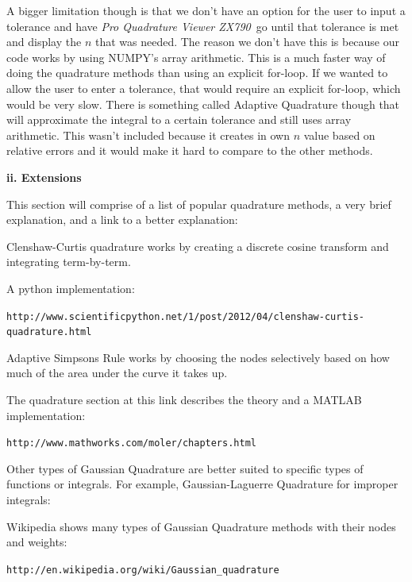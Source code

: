 \documentclass[12pt]{article}
\newcommand{\newLine}{\vspace{5mm}}
\newcommand{\appname}{\textit{Pro Quadrature Viewer ZX790}}
\newcommand{\nextsubsection}[1]{\newLine \noindent \large \textbf{#1} \normalsize}
\begin{document}
\newLine A bigger limitation though is that we don't have an option for the user to input a tolerance and have \appname\, go until that tolerance is met and display the $n$ that was needed. The reason we don't have this is because our code works by using NUMPY's array arithmetic. This is a much faster way of doing the quadrature methods than using an explicit for-loop. If we wanted to allow the user to enter a tolerance, that would require an explicit for-loop, which would be very slow. There is something called Adaptive Quadrature though that will approximate the integral to a certain tolerance and still uses array arithmetic. This wasn't included because it creates in own $n$ value based on relative errors and it would make it hard to compare to the other methods.

\nextsubsection{ii. Extensions}

\newLine This section will comprise of a list of popular quadrature methods, a very brief explanation, and a link to a better explanation:

\newLine Clenshaw-Curtis quadrature works by creating a discrete cosine transform and integrating term-by-term. 

\newLine\noindent A python implementation: 

\texttt{\small http://www.scientificpython.net/1/post/2012/04/clenshaw-curtis-quadrature.html \normalsize}

\newLine \newLine Adaptive Simpsons Rule works by choosing the nodes selectively based on how much of the area under the curve it takes up.

\newLine\noindent The quadrature section at this link describes the theory and a MATLAB implementation:

\texttt{\small http://www.mathworks.com/moler/chapters.html \normalsize}

\newLine\newLine Other types of Gaussian Quadrature are better suited to specific types of functions or integrals. For example, Gaussian-Laguerre Quadrature for improper integrals:

\newLine \noindent Wikipedia shows many types of Gaussian Quadrature methods with their nodes and weights:

\texttt{\small http://en.wikipedia.org/wiki/Gaussian\_quadrature \normalsize}
\end{document}
